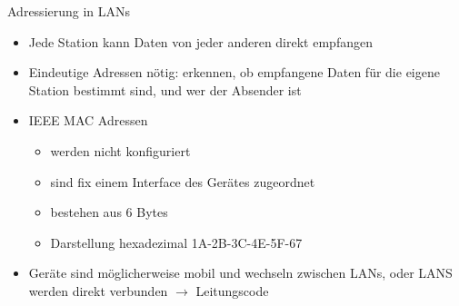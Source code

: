 \begin{concept}{Adressierung in LANs}
    \begin{itemize}
        \item Jede Station kann Daten von jeder anderen direkt empfangen
        \item Eindeutige Adressen nötig:  erkennen, ob empfangene Daten für die eigene Station bestimmt sind, und wer der Absender ist
        \item IEEE MAC Adressen
        \begin{itemize}
            \item werden nicht konfiguriert
            \item sind fix einem Interface des Gerätes zugeordnet
            \item bestehen aus 6 Bytes
            \item Darstellung hexadezimal 1A-2B-3C-4E-5F-67
        \end{itemize}
        \item Geräte sind möglicherweise mobil und wechseln zwischen LANs, oder LANS werden direkt verbunden $\longrightarrow$ Leitungscode
    \end{itemize}
\end{concept}



